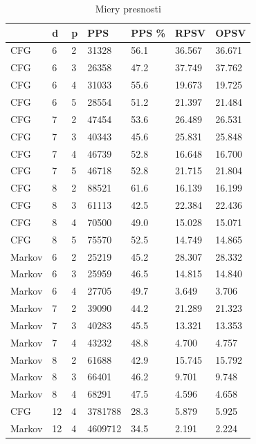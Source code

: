 \begin{table}[]
\centering
\caption{Miery presnosti}
\label{mieryPresnosti}
\begin{tabular}{lll|llll}
       & d  & p & PPS & PPS \% & RPSV  & OPSV\\ \hline
CFG    & 6  & 2 & 31328    & 56.1       & 36.567 & 36.671    \\
CFG    & 6  & 3 & 26358    & 47.2       & 37.749 & 37.762    \\
CFG    & 6  & 4 & 31033    & 55.6       & 19.673 & 19.725    \\
CFG    & 6  & 5 & 28554    & 51.2       & 21.397 & 21.484    \\
CFG    & 7  & 2 & 47454    & 53.6       & 26.489 & 26.531    \\
CFG    & 7  & 3 & 40343    & 45.6       & 25.831 & 25.848    \\
CFG    & 7  & 4 & 46739    & 52.8       & 16.648 & 16.700    \\
CFG    & 7  & 5 & 46718    & 52.8       & 21.715 & 21.804    \\
CFG    & 8  & 2 & 88521    & 61.6       & 16.139 & 16.199    \\
CFG    & 8  & 3 & 61113    & 42.5       & 22.384 & 22.436    \\
CFG    & 8  & 4 & 70500    & 49.0       & 15.028 & 15.071    \\
CFG    & 8  & 5 & 75570    & 52.5       & 14.749 & 14.865    \\
Markov & 6  & 2 & 25219    & 45.2       & 28.307 & 28.332    \\
Markov & 6  & 3 & 25959    & 46.5       & 14.815 & 14.840    \\
Markov & 6  & 4 & 27705    & 49.7       & 3.649 & 3.706    \\
Markov & 7  & 2 & 39090    & 44.2       & 21.289 & 21.323    \\
Markov & 7  & 3 & 40283    & 45.5       & 13.321 & 13.353    \\
Markov & 7  & 4 & 43232    & 48.8       & 4.700 & 4.757    \\
Markov & 8  & 2 & 61688    & 42.9       & 15.745 & 15.792    \\
Markov & 8  & 3 & 66401    & 46.2       & 9.701 & 9.748    \\
Markov & 8  & 4 & 68291    & 47.5       & 4.596 & 4.658    \\ \hline \hline
CFG    & 12 & 4 & 3781788    & 28.3       & 5.879 & 5.925    \\
Markov & 12 & 4 & 4609712    & 34.5       & 2.191 & 2.224   
\end{tabular}
\end{table}

